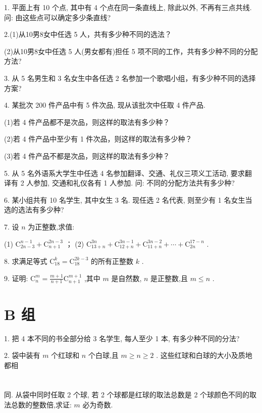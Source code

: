 \documentclass[10pt]{article}
\begin{document}
1. 平面上有 10 个点, 其中有 4 个点在同一条直线上, 除此以外, 不再有三点共线. 问: 由这些点可以确定多少条直线?

2.(1)从10男8女中任选 5 人，共有多少种不同的选法？

(2)从10男8女中任选 5 人(男女都有)担任 5 项不同的工作，共有多少种不同的分配方法?

3. 从 5 名男生和 3 名女生中各任选 2 名参加一个歌唱小组，有多少种不同的选择方案?

4. 某批次 200 件产品中有 5 件次品, 现从该批次中任取 4 件产品.

(1)若 4 件产品都不是次品，则这样的取法有多少种？

(2)若 4 件产品中至少有 1 件次品，则这样的取法有多少种？

(3)若 4 件产品不都是次品，则这样的取法有多少种？

5. 从 5 名外语系大学生中任选 4 名参加翻译、交通、礼仪三项义工活动, 要求翻译有 2 人参加, 交通和礼仪各有 1 人参加. 问: 不同的分配方法共有多少种?

6. 某小组共有 10 名学生, 其中女生 3 名. 现任选 2 名代表, 则至少有 1 名女生当选的选法有多少种?

7. 设 \(n\) 为正整数,求值:

(1) \({\mathrm{C}}_{{2n} - 3}^{n - 1} + {\mathrm{C}}_{n + 1}^{{2n} - 3}\) ； (2) \({\mathrm{C}}_{{13} + n}^{3n} + {\mathrm{C}}_{{12} + n}^{{3n} - 1} + {\mathrm{C}}_{{11} + n}^{{3n} - 2} + \cdots  + {\mathrm{C}}_{2n}^{{17} - n}\) .

8. 求满足等式 \({\mathrm{C}}_{18}^{k} = {\mathrm{C}}_{18}^{{2k} - 3}\) 的所有正整数 \(k\) .

9. 证明: \({\mathrm{C}}_{n}^{m} = \frac{m + 1}{n + 1}{\mathrm{C}}_{n + 1}^{m + 1}\) ,其中 \(m\) 是自然数, \(n\) 是正整数,且 \(m \leq  n\) .

\section*{B 组}

1. 把 4 本不同的书全部分给 3 名学生, 每人至少 1 本, 有多少种不同的分法?

2. 袋中装有 \(m\) 个红球和 \(n\) 个白球,且 \(m \geq  n \geq  2\) . 这些红球和白球的大小及质地都相



\section*{}

同. 从袋中同时任取 2 个球, 若 2 个球都是红球的取法总数是 2 个球颜色不同的取法总数的整数倍,求证: \(m\) 必为奇数.
\end{document}
